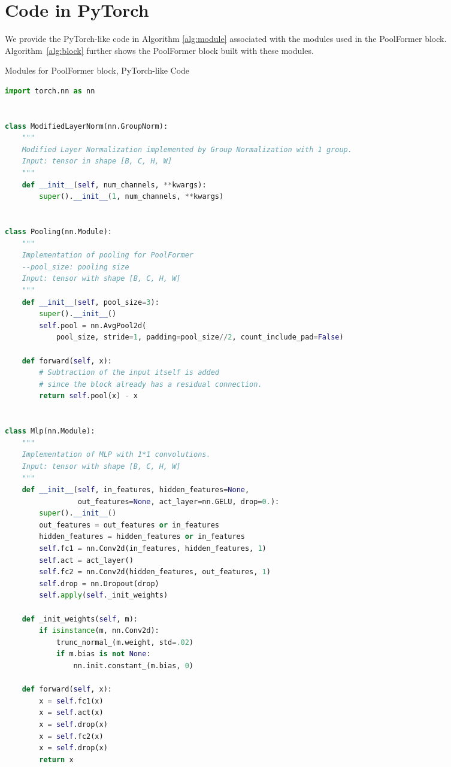 \section{Code in PyTorch}
We provide the PyTorch-like code in Algorithm \ref{alg:module} associated with the modules used in the PoolFormer block. Algorithm~\ref{alg:block} further shows the PoolFormer block built with these modules. 


\begin{algorithm*}[t]
\caption{Modules for PoolFormer block, PyTorch-like Code}
\label{alg:module}
\begin{lstlisting}[language=python]
import torch.nn as nn


class ModifiedLayerNorm(nn.GroupNorm):
    """
    Modified Layer Normalization implemented by Group Normalization with 1 group.
    Input: tensor in shape [B, C, H, W]
    """
    def __init__(self, num_channels, **kwargs):
        super().__init__(1, num_channels, **kwargs)


class Pooling(nn.Module):
    """
    Implementation of pooling for PoolFormer
    --pool_size: pooling size
    Input: tensor with shape [B, C, H, W]
    """
    def __init__(self, pool_size=3):
        super().__init__()
        self.pool = nn.AvgPool2d(
            pool_size, stride=1, padding=pool_size//2, count_include_pad=False)

    def forward(self, x):
        # Subtraction of the input itself is added 
        # since the block already has a residual connection.
        return self.pool(x) - x


class Mlp(nn.Module):
    """
    Implementation of MLP with 1*1 convolutions.
    Input: tensor with shape [B, C, H, W]
    """
    def __init__(self, in_features, hidden_features=None, 
                 out_features=None, act_layer=nn.GELU, drop=0.):
        super().__init__()
        out_features = out_features or in_features
        hidden_features = hidden_features or in_features
        self.fc1 = nn.Conv2d(in_features, hidden_features, 1)
        self.act = act_layer()
        self.fc2 = nn.Conv2d(hidden_features, out_features, 1)
        self.drop = nn.Dropout(drop)
        self.apply(self._init_weights)

    def _init_weights(self, m):
        if isinstance(m, nn.Conv2d):
            trunc_normal_(m.weight, std=.02)
            if m.bias is not None:
                nn.init.constant_(m.bias, 0)

    def forward(self, x):
        x = self.fc1(x)
        x = self.act(x)
        x = self.drop(x)
        x = self.fc2(x)
        x = self.drop(x)
        return x
\end{lstlisting}
\end{algorithm*}


